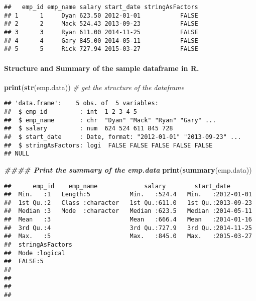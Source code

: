 \documentclass[
]{article}
\newenvironment{Shaded}{\begin{snugshade}}{\end{snugshade}}
\newcommand{\CommentTok}[1]{\textcolor[rgb]{0.56,0.35,0.01}{\textit{#1}}}
\newcommand{\DocumentationTok}[1]{\textcolor[rgb]{0.56,0.35,0.01}{\textbf{\textit{#1}}}}
\newcommand{\FunctionTok}[1]{\textcolor[rgb]{0.13,0.29,0.53}{\textbf{#1}}}
\newcommand{\NormalTok}[1]{#1}
\begin{document}
\begin{verbatim}
##   emp_id emp_name salary start_date stringAsFactors
## 1      1     Dyan 623.50 2012-01-01           FALSE
## 2      2     Mack 524.43 2013-09-23           FALSE
## 3      3     Ryan 611.00 2014-11-25           FALSE
## 4      4     Gary 845.00 2014-05-11           FALSE
## 5      5     Rick 727.94 2015-03-27           FALSE
\end{verbatim}

\paragraph{Structure and Summary of the sample dataframe in
R.}\label{structure-and-summary-of-the-sample-dataframe-in-r.}

\begin{Shaded}
\begin{Highlighting}[]
\FunctionTok{print}\NormalTok{(}\FunctionTok{str}\NormalTok{(emp.data)) }\CommentTok{\# get the structure of the dataframe}
\end{Highlighting}
\end{Shaded}

\begin{verbatim}
## 'data.frame':    5 obs. of  5 variables:
##  $ emp_id         : int  1 2 3 4 5
##  $ emp_name       : chr  "Dyan" "Mack" "Ryan" "Gary" ...
##  $ salary         : num  624 524 611 845 728
##  $ start_date     : Date, format: "2012-01-01" "2013-09-23" ...
##  $ stringAsFactors: logi  FALSE FALSE FALSE FALSE FALSE
## NULL
\end{verbatim}

\begin{Shaded}
\begin{Highlighting}[]
\DocumentationTok{\#\#\#\# Print the summary of the emp.data}
\FunctionTok{print}\NormalTok{(}\FunctionTok{summary}\NormalTok{(emp.data))}
\end{Highlighting}
\end{Shaded}

\begin{verbatim}
##      emp_id    emp_name             salary        start_date        
##  Min.   :1   Length:5           Min.   :524.4   Min.   :2012-01-01  
##  1st Qu.:2   Class :character   1st Qu.:611.0   1st Qu.:2013-09-23  
##  Median :3   Mode  :character   Median :623.5   Median :2014-05-11  
##  Mean   :3                      Mean   :666.4   Mean   :2014-01-16  
##  3rd Qu.:4                      3rd Qu.:727.9   3rd Qu.:2014-11-25  
##  Max.   :5                      Max.   :845.0   Max.   :2015-03-27  
##  stringAsFactors
##  Mode :logical  
##  FALSE:5        
##                 
##                 
##                 
## 
\end{verbatim}
\end{document}
